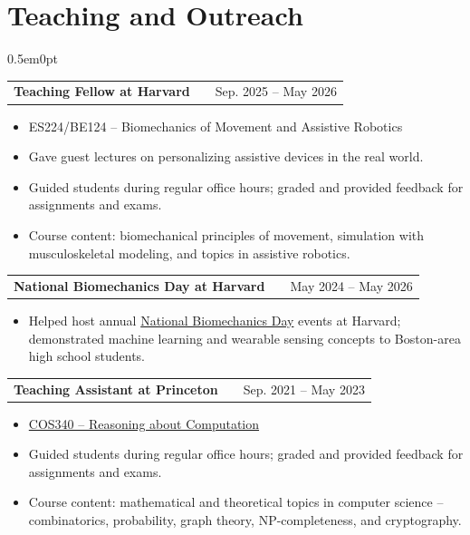 \documentclass[letterpaper,11pt]{article}
\makeatletter
\newenvironment{joblong}[2]
    {
    \begin{tabularx}{\linewidth}{@{}l X r@{}}
    \textbf{#1} & \hfill &  #2 \\[3pt]
    \end{tabularx}
    \begin{minipage}[t]{\linewidth}
    \begin{itemize}[nosep,after=\strut, leftmargin=2em, itemsep=3pt,label=--]
    }
    {
    \end{itemize}
    \end{minipage}
    }
\makeatother
\begin{document}
\section{Teaching and Outreach}
\begin{adjustwidth}{0.5em}{0pt}

\begin{joblong}{Teaching Fellow at Harvard}{Sep. 2025 – May 2026}
\item ES224/BE124 – Biomechanics of Movement and Assistive Robotics
\item Gave guest lectures on personalizing assistive devices in the real world.
\item Guided students during regular office hours; graded and provided feedback for assignments and exams.
\item Course content: biomechanical principles of movement, simulation with musculoskeletal modeling, and topics in assistive robotics.
\end{joblong}

\begin{joblong}{National Biomechanics Day at Harvard}{May 2024 – May 2026}
\item Helped host annual \href{https://sladelab.seas.harvard.edu/outreach/}{National Biomechanics Day} events at Harvard; demonstrated machine learning and wearable sensing concepts to Boston-area high school students.
\end{joblong}

\begin{joblong}{Teaching Assistant at Princeton}{Sep. 2021 – May 2023}
\item \href{https://www.cs.princeton.edu/courses/archive/fall21/cos340/}{COS340 – Reasoning about Computation}
\item Guided students during regular office hours; graded and provided feedback for assignments and exams.
\item Course content: mathematical and theoretical topics in computer science – combinatorics, probability, graph theory, NP-completeness, and cryptography.
\end{joblong}


\end{adjustwidth}
\end{document}
